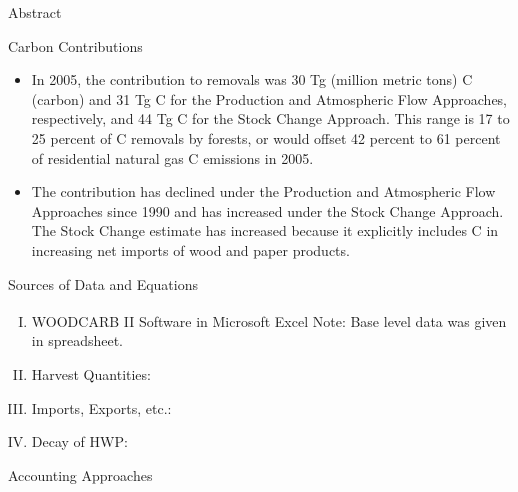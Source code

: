 \documentclass[final]{beamer}\usepackage[]{graphicx}\usepackage[]{color}
\newlength{\onecolwid}
\begin{document}
\begin{frame}[t]
\begin{columns}[t]
\begin{column}{\onecolwid}
\begin{alertblock}{Abstract}
\end{alertblock}


\begin{block}{Carbon Contributions}
\begin{itemize}
\item In 2005, the contribution to removals was 30 Tg (million metric tons) C (carbon) and 31 Tg C for the Production and Atmospheric Flow Approaches, respectively, and 44 Tg C for the Stock Change Approach. This range is 17 to 25 percent of C removals by forests, or would offset 42 percent to 61 percent of residential natural gas C emissions in 2005. 
\vspace{1ex}
\item The contribution has declined under the Production and Atmospheric Flow Approaches since 1990 and has increased under the Stock Change Approach. The Stock Change estimate has increased because it explicitly includes C in increasing net imports of wood and paper products. 
\vspace{1ex}
\end{itemize}
\vspace{0ex}
\vfill
\end{block}


\begin{block}{Sources of Data and Equations}

\begin{enumerate}[I.]
\item WOODCARB II Software in Microsoft Excel\textsuperscript{\textregistered}
\vspace{0ex}
Note: Base level data was given in spreadsheet. 
\item Harvest Quantities:
\item Imports, Exports, etc.:
\item Decay of HWP:
\end{enumerate}
\vspace{0ex}

\end{block}
\vfill


\begin{block}{Accounting Approaches}


\end{block}
\end{column}
\end{columns}
\end{frame}
\end{document}
